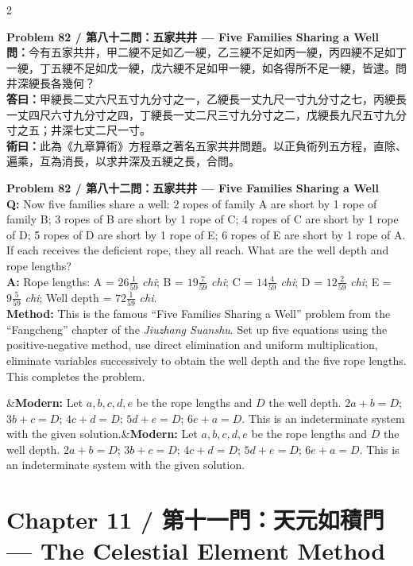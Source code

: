 \documentclass[11pt,a4paper]{article}
\newcommand{\bilingualproblem}[4]{%
  \begin{paracol}{2}
  \begin{leftcolumn}
  \noindent\textbf{\color{problemcolor}#1}\\[0.2cm]
  #2
  \end{leftcolumn}
  \switchcolumn
  \noindent\textbf{\color{problemcolor}#1}\\[0.2cm]
  #3
  \end{paracol}
  \ifx&#4&\else\vspace{0.3cm}\noindent#4\fi
  \vspace{0.5cm}
}
\newcommand{\wen}[1]{\textcolor{problemcolor}{\textbf{問：}}#1}
\newcommand{\da}[1]{\textcolor{answercolor}{\textbf{答曰：}}#1}
\newcommand{\shu}[1]{\textcolor{methodcolor}{\textbf{術曰：}}#1}
\newcommand{\wenen}[1]{\textcolor{problemcolor}{\textbf{Q:}} #1}
\newcommand{\daen}[1]{\textcolor{answercolor}{\textbf{A:}} #1}
\newcommand{\shuen}[1]{\textcolor{methodcolor}{\textbf{Method:}} #1}
\begin{document}
\bilingualproblem{Problem 82 / 第八十二問：五家共井 --- Five Families Sharing a Well}{
\wen{今有五家共井，甲二綆不足如乙一綆，乙三綆不足如丙一綆，丙四綆不足如丁一綆，丁五綆不足如戊一綆，戊六綆不足如甲一綆，如各得所不足一綆，皆逮。問井深綆長各幾何？}\\[0.2cm]
\da{甲綆長二丈六尺五寸九分寸之一，乙綆長一丈九尺一寸九分寸之七，丙綆長一丈四尺六寸九分寸之四，丁綆長一丈二尺三寸九分寸之二，戊綆長九尺五寸九分寸之五；井深七丈二尺一寸。}\\[0.2cm]
\shu{此為《九章算術》方程章之著名五家共井問題。以正負術列五方程，直除、遍乘，互為消長，以求井深及五綆之長，合問。}
}{
\wenen{Now five families share a well: 2 ropes of family A are short by 1 rope of family B; 3 ropes of B are short by 1 rope of C; 4 ropes of C are short by 1 rope of D; 5 ropes of D are short by 1 rope of E; 6 ropes of E are short by 1 rope of A. If each receives the deficient rope, they all reach. What are the well depth and rope lengths?}\\[0.2cm]
\daen{Rope lengths: A = $26\frac{1}{59}$ \textit{chi}; B = $19\frac{7}{59}$ \textit{chi}; C = $14\frac{4}{59}$ \textit{chi}; D = $12\frac{2}{59}$ \textit{chi}; E = $9\frac{5}{59}$ \textit{chi}; Well depth = $72\frac{1}{59}$ \textit{chi}.}\\[0.2cm]
\shuen{This is the famous ``Five Families Sharing a Well'' problem from the ``Fangcheng'' chapter of the \textit{Jiuzhang Suanshu}. Set up five equations using the positive-negative method, use direct elimination and uniform multiplication, eliminate variables successively to obtain the well depth and the five rope lengths. This completes the problem.}
}{\textbf{Modern:} Let $a, b, c, d, e$ be the rope lengths and $D$ the well depth. $2a + b = D$; $3b + c = D$; $4c + d = D$; $5d + e = D$; $6e + a = D$. This is an indeterminate system with the given solution.}

\newpage

\section{Chapter 11 / 第十一門：天元如積門 --- The Celestial Element Method}
\label{sec:tianyuan}
\end{document}
